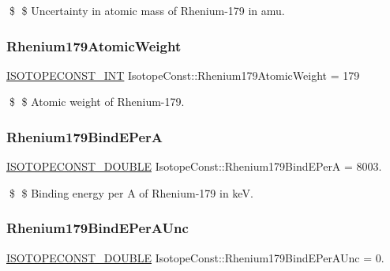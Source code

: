 \$ \$ Uncertainty in atomic mass of Rhenium-\/179 in amu. \mbox{\label{group___isotope_const-_rhenium-_re179_gaf074360db5d9ef111429c99262894ef9}} 
\subsubsection{\texorpdfstring{Rhenium179\+Atomic\+Weight}{Rhenium179AtomicWeight}}
{\footnotesize\ttfamily \mbox{\hyperlink{group___isotope_const-_macros_ga5f18360b3e99483a35c32d789e62621c}{I\+S\+O\+T\+O\+P\+E\+C\+O\+N\+S\+T\+\_\+\+I\+NT}} Isotope\+Const\+::\+Rhenium179\+Atomic\+Weight = 179}

\$ \$ Atomic weight of Rhenium-\/179. \mbox{\label{group___isotope_const-_rhenium-_re179_gafc673d79b1cf64cc8e2c7e5fa79c0ddc}} 
\subsubsection{\texorpdfstring{Rhenium179\+Bind\+E\+PerA}{Rhenium179BindEPerA}}
{\footnotesize\ttfamily \mbox{\hyperlink{group___isotope_const-_macros_ga8f45a7272ce02c0b4c65c44636ed719a}{I\+S\+O\+T\+O\+P\+E\+C\+O\+N\+S\+T\+\_\+\+D\+O\+U\+B\+LE}} Isotope\+Const\+::\+Rhenium179\+Bind\+E\+PerA = 8003.}

\$ \$ Binding energy per A of Rhenium-\/179 in keV. \mbox{\label{group___isotope_const-_rhenium-_re179_ga2e0e7446162d2dafea41c0e83d01f91f}} 
\subsubsection{\texorpdfstring{Rhenium179\+Bind\+E\+Per\+A\+Unc}{Rhenium179BindEPerAUnc}}
{\footnotesize\ttfamily \mbox{\hyperlink{group___isotope_const-_macros_ga8f45a7272ce02c0b4c65c44636ed719a}{I\+S\+O\+T\+O\+P\+E\+C\+O\+N\+S\+T\+\_\+\+D\+O\+U\+B\+LE}} Isotope\+Const\+::\+Rhenium179\+Bind\+E\+Per\+A\+Unc = 0.}

